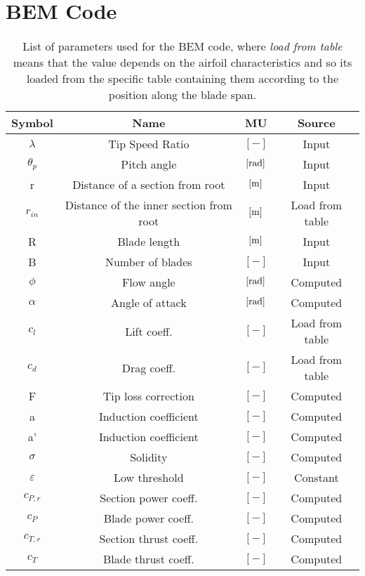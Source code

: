 \section{BEM Code}\label{app:BEM_code}
\begin{table}[htb]
  \caption{List of parameters used for the BEM code, where \textit{load from table} means that the value depends on the airfoil characteristics and so its loaded from the specific table containing them according to the position along the blade span.}
  \centering
  \begin{tabular}{cccc}
  \toprule
  Symbol & Name & MU & Source \\ \midrule
  $\lambda$ & Tip Speed Ratio & $\left[-\right]$ & Input \\
  $\theta_p$ & Pitch angle & $\left[\si{\radian}\right]$ & Input \\
  r & Distance of a section from root & $\left[\si{\meter}\right]$ & Input \\
  $r_{in}$ & Distance of the inner section from root & $\left[\si{\meter}\right]$ & Load from table \\
  R & Blade length & $\left[\si{\meter}\right]$ & Input \\
  B & Number of blades & $\left[-\right]$ & Input \\
  $\phi$ & Flow angle & $\left[\si{\radian}\right]$ & Computed \\
  $\alpha$ & Angle of attack & $\left[\si{\radian}\right]$ & Computed \\
  $c_l$ & Lift coeff. & $\left[-\right]$ & Load from table\\
  $c_d$ & Drag coeff. & $\left[-\right]$ & Load from table\\
  F & Tip loss correction & $\left[-\right]$ & Computed\\
  a & Induction coefficient & $\left[-\right]$ & Computed \\
  a' & Induction coefficient & $\left[-\right]$ & Computed \\
  $\sigma$ & Solidity & $\left[-\right]$ & Computed\\
  $\varepsilon$ & Low threshold & $\left[-\right]$  & Constant \\
  $c_{P,r}$ & Section power coeff. & $\left[-\right]$ & Computed\\
  $c_{P}$ & Blade power coeff. & $\left[-\right]$ & Computed\\
  $c_{T,r}$ & Section thrust coeff. & $\left[-\right]$ & Computed\\
  $c_{T}$ & Blade thrust coeff.& $\left[-\right]$ & Computed\\
  \bottomrule
  \end{tabular}
  \label{tab:BEM_code_notation}
\end{table}



